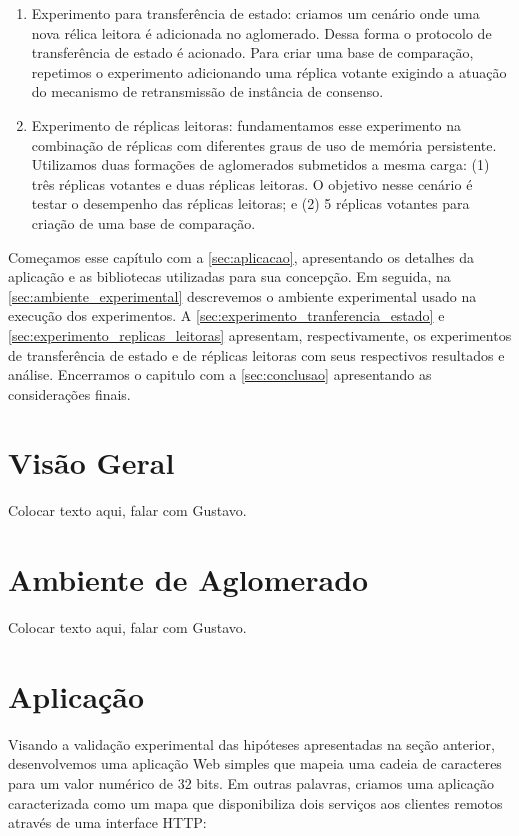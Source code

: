 \begin{enumerate}
  \item Experimento para transferência de estado: criamos um cenário onde uma nova rélica
    leitora é adicionada no aglomerado. Dessa forma o protocolo de transferência de estado
    é acionado. Para criar uma base de comparação, repetimos o experimento adicionando uma
    réplica votante exigindo a atuação do mecanismo de retransmissão de instância de
    consenso.
  \item Experimento de réplicas leitoras: fundamentamos esse experimento na combinação de
    réplicas com diferentes graus de uso de memória persistente. Utilizamos duas formações
    de aglomerados submetidos a mesma carga: (1) três réplicas votantes e duas réplicas
    leitoras. O objetivo nesse cenário é testar o desempenho das réplicas leitoras; e (2)
    5 réplicas votantes para criação de uma base de comparação.
\end{enumerate}

Começamos esse capítulo com a \autoref{sec:aplicacao}, apresentando os detalhes da
aplicação e as bibliotecas utilizadas para sua concepção. Em seguida, na
\autoref{sec:ambiente_experimental} descrevemos o ambiente experimental usado na execução
dos experimentos. A \autoref{sec:experimento_tranferencia_estado} e
\autoref{sec:experimento_replicas_leitoras} apresentam, respectivamente, os experimentos de
transferência de estado e de réplicas leitoras com seus respectivos resultados e análise.
Encerramos o capitulo com a \autoref{sec:conclusao} apresentando as considerações finais.

\section{Visão Geral}

Colocar texto aqui, falar com Gustavo.

\section{Ambiente de Aglomerado}

Colocar texto aqui, falar com Gustavo.

\section{Aplicação}\label{sec:aplicacao}

Visando a validação experimental das hipóteses apresentadas na seção anterior,
desenvolvemos uma aplicação Web simples que mapeia uma cadeia de caracteres para um valor
numérico de 32 bits. Em outras palavras, criamos uma aplicação caracterizada como um mapa
que disponibiliza dois serviços aos clientes remotos através de uma interface HTTP:

